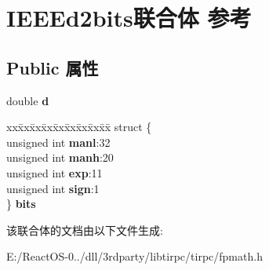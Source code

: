 \hypertarget{union_i_e_e_ed2bits}{}\section{I\+E\+E\+Ed2bits联合体 参考}
\label{union_i_e_e_ed2bits}
\subsection*{Public 属性}
\begin{DoxyCompactItemize}
\item 
\mbox{\label{union_i_e_e_ed2bits_a33c7c3c2262532e75937397d13c1d82a}} 
double {\bfseries d}
\item 
\mbox{\label{union_i_e_e_ed2bits_ad9bb54ff6513af97c23994072dd03abc}} 
\begin{tabbing}
xx\=xx\=xx\=xx\=xx\=xx\=xx\=xx\=xx\=\kill
struct \{\\
\>unsigned int {\bfseries manl}:32\\
\>unsigned int {\bfseries manh}:20\\
\>unsigned int {\bfseries exp}:11\\
\>unsigned int {\bfseries sign}:1\\
\} {\bfseries bits}\\

\end{tabbing}\end{DoxyCompactItemize}


该联合体的文档由以下文件生成\+:\begin{DoxyCompactItemize}
\item 
E\+:/\+React\+O\+S-\/0../dll/3rdparty/libtirpc/tirpc/fpmath.\+h\end{DoxyCompactItemize}
